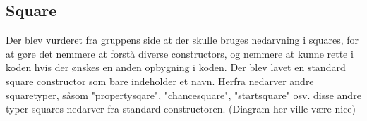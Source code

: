 \documentclass[../../main.tex]{subfiles}
\begin{document}
\begin{flushleft}
\subsection{Square}

Der blev vurderet fra gruppens side at der skulle bruges nedarvning i squares, for at gøre det nemmere at forstå diverse constructors, og nemmere at kunne rette i koden hvis der ønskes en anden opbygning i koden. 
Der blev lavet en standard square constructor som bare indeholder et navn. Herfra nedarver andre squaretyper, såsom "propertysqare", "chancesquare", "startsquare" osv. disse andre typer squares nedarver fra standard constructoren. (Diagram her ville være nice) 

\end{flushleft}
\end{document}
